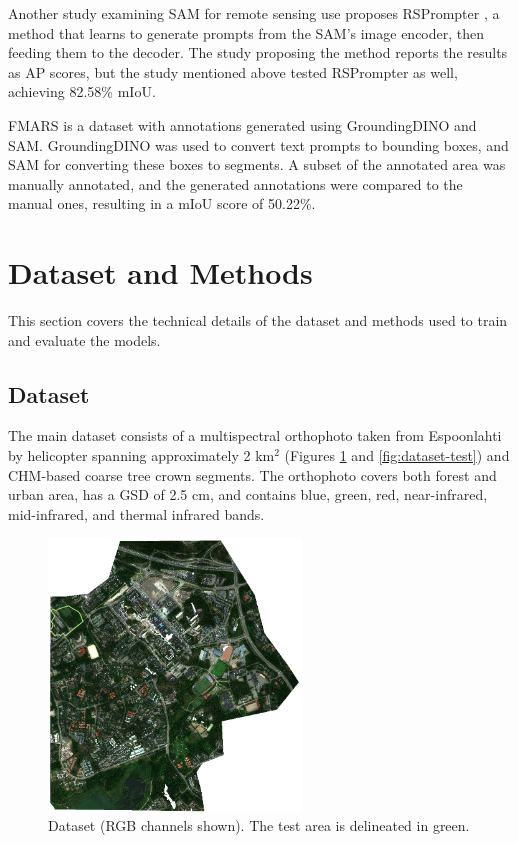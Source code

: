 \documentclass[english, 12pt, a4paper, sci, utf8, a-2b, online]{aaltothesis}
\begin{document}
Another study examining SAM for remote sensing use proposes RSPrompter \cite{rsprompter}, a method that learns to generate prompts from the SAM's image encoder, then feeding them to the decoder. The study proposing the method reports the results as AP scores, but the study mentioned above tested RSPrompter as well, achieving 82.58\% mIoU. \cite{sam-treecrown}

FMARS \cite{fmars} is a dataset with annotations generated using GroundingDINO and SAM. GroundingDINO was used to convert text prompts to bounding boxes, and SAM for converting these boxes to segments. A subset of the annotated area was manually annotated, and the generated annotations were compared to the manual ones, resulting in a mIoU score of 50.22\%.

\newpage
\section{Dataset and Methods}

This section covers the technical details of the dataset and methods used to train and evaluate the models.

\subsection{Dataset}

The main dataset consists of a multispectral orthophoto taken from Espoonlahti by helicopter spanning approximately 2 km$^2$ (Figures \ref{fig:dataset-ortho} and \ref{fig:dataset-test}) and CHM-based coarse tree crown segments. The orthophoto covers both forest and urban area, has a GSD of 2.5 cm, and contains blue, green, red, near-infrared, mid-infrared, and thermal infrared bands.

\begin{figure}[h]
    \centering
    \includegraphics[width=0.6\textwidth]{figures/dataset-ortho.png}
    \caption{Dataset (RGB channels shown). The test area is delineated in green.}
    \label{fig:dataset-ortho}
\end{figure}
\end{document}

